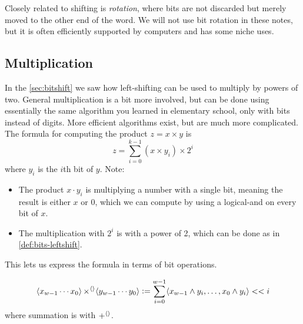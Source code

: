 Closely related to shifting is \emph{rotation}, where bits are not
discarded but merely moved to the other end of the word.  We will not
use bit rotation in these notes, but it is often efficiently supported
by computers and has some niche uses.

\subsection{Multiplication}
\label{sec:bit-multiplication}

In the \cref{sec:bitshift} we saw how left-shifting can be used to
multiply by powers of two.  General multiplication is a bit more
involved, but can be done using essentially the same algorithm you
learned in elementary school, only with bits instead of digits.  More
efficient algorithms exist, but are much more complicated.  The
formula for computing the product $z=x\times{}y$ is
\begin{equation}
  z = \sum_{i=0}^{k-1} (x \times y_{i}) \times 2^{i}
\end{equation}
where $y_{i}$ is the $i$th bit of $y$.  Note:
\begin{itemize}
\item The product $x \cdot y_{i}$ is multiplying a number with a
  single bit, meaning the result is either $x$ or $0$, which we can
  compute by using a logical-and on every bit of $x$.
\item The multiplication with $2^{i}$ is with a power of 2, which can
  be done as in \cref{def:bits-leftshift}.
\end{itemize}

This lets us express the formula in terms of bit operations.

\begin{definition}
\begin{align*}
  \langle x_{w-1}\cdots{}x_{0} \rangle \operatorname{\times^{\langle\rangle}} \langle y_{w-1}\cdots{}y_{0} \rangle \vcentcolon=
  \sum_{i=0}^{w-1} \langle x_{w-1} \land y_{i},\ldots,x_{0} \land y_{i} \rangle << i
\end{align*}
where summation is with $\operatorname{+^{\langle\rangle}}$.
\end{definition}

